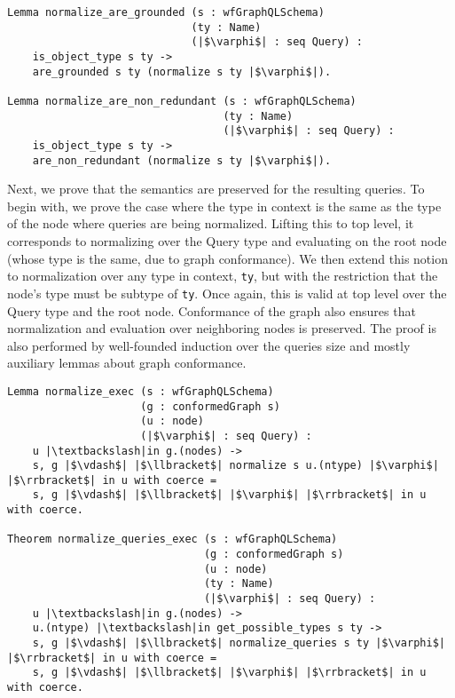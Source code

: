 \begin{verbatim}
Lemma normalize_are_grounded (s : wfGraphQLSchema)
                             (ty : Name)
                             (|$\varphi$| : seq Query) :
    is_object_type s ty ->
    are_grounded s ty (normalize s ty |$\varphi$|).

Lemma normalize_are_non_redundant (s : wfGraphQLSchema)
                                  (ty : Name)
                                  (|$\varphi$| : seq Query) :
    is_object_type s ty ->
    are_non_redundant (normalize s ty |$\varphi$|).

\end{verbatim}

Next, we prove that the semantics are preserved for the resulting queries. To begin with, we prove the case where the type in context is the same as the type of the node where queries are being normalized. Lifting this to top level, it corresponds to normalizing over the Query type and evaluating on the root node (whose type is the same, due to graph conformance). We then extend this notion to normalization over any type in context, \texttt{ty}, but with the restriction that the node's type must be subtype of \texttt{ty}. Once again, this is valid at top level over the Query type and the root node. Conformance of the graph also ensures that normalization and evaluation over neighboring nodes is preserved. The proof is also performed by well-founded induction over the queries size and mostly auxiliary lemmas about graph conformance.

\begin{verbatim}
Lemma normalize_exec (s : wfGraphQLSchema)
                     (g : conformedGraph s)
                     (u : node)
                     (|$\varphi$| : seq Query) :
    u |\textbackslash|in g.(nodes) ->
    s, g |$\vdash$| |$\llbracket$| normalize s u.(ntype) |$\varphi$| |$\rrbracket$| in u with coerce =
    s, g |$\vdash$| |$\llbracket$| |$\varphi$| |$\rrbracket$| in u with coerce.

Theorem normalize_queries_exec (s : wfGraphQLSchema)
                               (g : conformedGraph s)
                               (u : node)
                               (ty : Name)
                               (|$\varphi$| : seq Query) :
    u |\textbackslash|in g.(nodes) ->
    u.(ntype) |\textbackslash|in get_possible_types s ty ->
    s, g |$\vdash$| |$\llbracket$| normalize_queries s ty |$\varphi$| |$\rrbracket$| in u with coerce =
    s, g |$\vdash$| |$\llbracket$| |$\varphi$| |$\rrbracket$| in u with coerce.

\end{verbatim}


